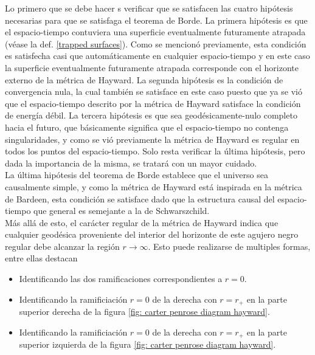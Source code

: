 \documentclass[16pt,a4paper]{article}
\numberwithin{equation}{section}
\theoremstyle{definition}
\begin{document}
Lo primero que se debe hacer s verificar que se satisfacen las cuatro hipótesis necesarias para que se satisfaga el teorema de Borde. La primera hipótesis es que el espacio-tiempo contuviera una superficie eventualmente futuramente atrapada (véase la def. \ref*{trapped surfaces}). Como se mencionó previamente, esta condición es satisfecha casi que automáticamente en cualquier espacio-tiempo y en este caso la superficie eventualmente futuramente atrapada corresponde con el horizonte externo de la métrica de Hayward. La segunda hipótesis es la condición de convergencia nula, la cual también se satisface en este caso puesto que ya se vió que el espacio-tiempo descrito por la métrica de Hayward satisface la condición de energía débil. La tercera hipótesis es que sea geodésicamente-nulo completo hacia el futuro, que básicamente significa que el espacio-tiempo no contenga singularidades, y como se vió previamente la métrica de Hayward es regular en todos los puntos del espacio-tiempo. Solo resta verificar la última hipótesis, pero dada la importancia de la misma, se tratará con un mayor cuidado.\\

La última hipótesis del teorema de Borde establece que el universo sea causalmente simple, y como la métrica de Hayward está inspirada en la métrica de Bardeen, esta condición se satisface dado que la estructura causal del espacio-tiempo que general es semejante a la de Schwarszchild.\\

Más allá de esto, el carácter regular de la métrica de Hayward indica que cualquier geodésica proveniente del interior del horizonte de este agujero negro regular debe alcanzar la región $r \to \infty$. Esto puede realizarse de multiples formas, entre ellas destacan

\begin{itemize}
\item Identificando las dos ramificaciones correspondientes a $r = 0$.

\item Identificando la ramificiación $r = 0$ de la derecha con $r = r_+$ en la parte superior derecha de la figura \ref{fig: carter penrose diagram hayward}.

\item Identificando la ramificiación $r = 0$ de la derecha con $r = r_+$ en la parte superior izquierda de la figura \ref{fig: carter penrose diagram hayward}.
\end{itemize}
\end{document}
